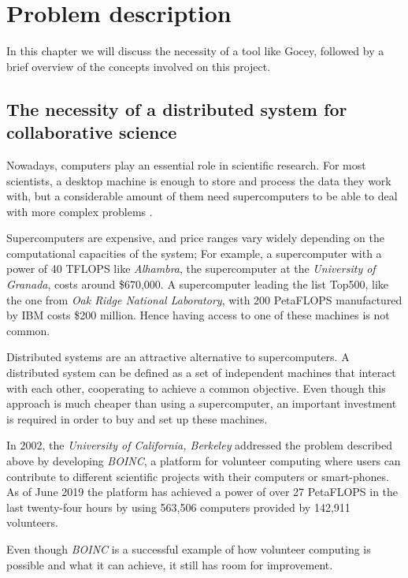 \chapter{Problem description}

In this chapter we will discuss the necessity of a tool like Gocey, followed by a brief overview of the concepts involved on this project.

\section{The necessity of a distributed system for collaborative science}
Nowadays, computers play an essential role in scientific research. For most scientists, a desktop machine is enough to store and process the data they work with, but a considerable amount of them need supercomputers to be able to deal with more complex problems \cite{computing-in-science}.

Supercomputers are expensive, and price ranges vary widely depending on the computational capacities of the system; For example, a supercomputer with a power of 40 TFLOPS like \textit{Alhambra}, the supercomputer at the \textit{University of Granada}, costs around \$670,000\cite{ideal-alhambra}. A supercomputer leading the list Top500,  like the one from \textit{Oak Ridge National Laboratory}, with 200 PetaFLOPS manufactured by IBM costs \$200 million\cite{oak-ridge}. Hence having access to one of these machines is not common.

Distributed systems are an attractive alternative to supercomputers. A distributed system can be defined as a set of independent machines that interact with each other, cooperating to achieve a common objective. Even though this approach is much cheaper than using a supercomputer, an important investment is required in order to buy and set up these machines.

In 2002, the \textit{University of California, Berkeley} addressed the problem described above by developing \textit{BOINC}\cite{boinc-website}, a platform for volunteer computing where users can contribute to different scientific projects with their computers or smart-phones. As of June 2019 the platform has achieved a power of over 27 PetaFLOPS in the last twenty-four hours by using 563,506 computers provided by 142,911 volunteers.

Even though \textit{BOINC} is a successful example of how volunteer computing is possible and what it can achieve, it still has room for improvement. 

